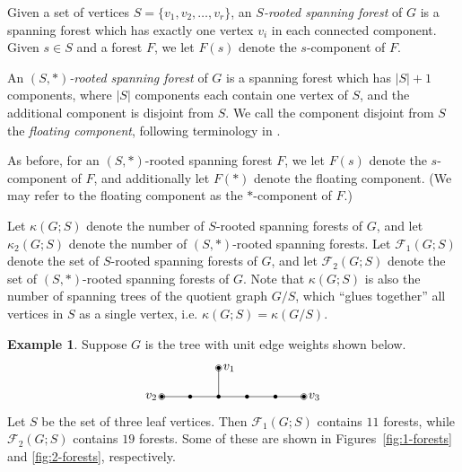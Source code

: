 \documentclass{amsart}
\theoremstyle{definition}
\newtheorem{eg}[thm]{Example}
\newcommand{\trees}{\mathcal{F}_1}
\newcommand{\forests}{\mathcal{F}}
\begin{document}
Given a set of vertices $S = \{v_1, v_2, \ldots, v_r\}$,
an {\em $S$-rooted spanning forest} of $G$ 
is a spanning forest which has exactly one vertex $v_i$ in each connected component.
Given $s \in S$ and a forest $F$,
we let $F(s)$ denote the $s$-component of $F$.

An {\em $(S,*)$-rooted spanning forest} of $G$ is a spanning forest which has $|S|+1$ components, where $|S|$ components each contain one vertex of $S$, and the additional component is disjoint from $S$.
We call the component disjoint from $S$ the {\em floating component}, following terminology in \cite{kassel-kenyon-wu}.

As before, for an $(S,*)$-rooted spanning forest $F$,
we let $F(s)$ denote the $s$-component of $F$, and additionally let $F(*)$ denote the floating component.
(We may refer to the floating component as the $*$-component of $F$.)

Let $\kappa(G;S)$ denote the number of $S$-rooted spanning forests of $G$, and let $\kappa_2(G; S)$ denote the number of $(S,*)$-rooted spanning forests.
Let $\trees(G;S)$ denote the set of $S$-rooted spanning forests of $G$,
and let $\forests_2(G;S)$ denote the set of $(S,*)$-rooted spanning forests of $G$.
Note that $\kappa(G;S)$ is also the number of 
spanning trees of the quotient graph $G / S$, which ``glues together'' all vertices in $S$ as a single vertex,
i.e. $\kappa(G; S) =  \kappa(G/S)$.


\begin{eg}
Suppose $G$ is the tree with unit edge weights shown below.
\[
\begin{tikzpicture}[scale=0.8]
	\coordinate (1) at (0,0);
	\coordinate (A) at (1,0);
	\coordinate (B) at (2,0);
	\coordinate (C) at (3,0);
	\coordinate (D) at (4,0);
	\coordinate (2) at (5,0);
	\coordinate (3) at (2,1);
	
	\foreach \c in {1,2,3,A,B,C,D} {
		\fill (\c) circle (2pt);
	}
	\foreach \c in {1,2,3} {
		\draw (\c) circle (3pt);
	}

	\draw (1) -- (A);
	\draw (A) -- (B);
	\draw (B) -- (3);
	\draw (B) -- (C);
	\draw (C) -- (D);
	\draw (D) -- (2);
	
	\foreach \c/\d/\label in {1/left/v_2,2/right/v_3,3/right/v_1} {
		\node[\d=0.2] at (\c) {$\label$};
	}
\end{tikzpicture}
\]
Let $S$ be the set of three leaf vertices.
Then $\trees(G;S)$ contains $11$ forests,
while $\forests_2(G;S)$ contains $19$ forests.
Some of these are shown in Figures~\ref{fig:1-forests} and \ref{fig:2-forests}, respectively.
\end{eg}
\end{document}
